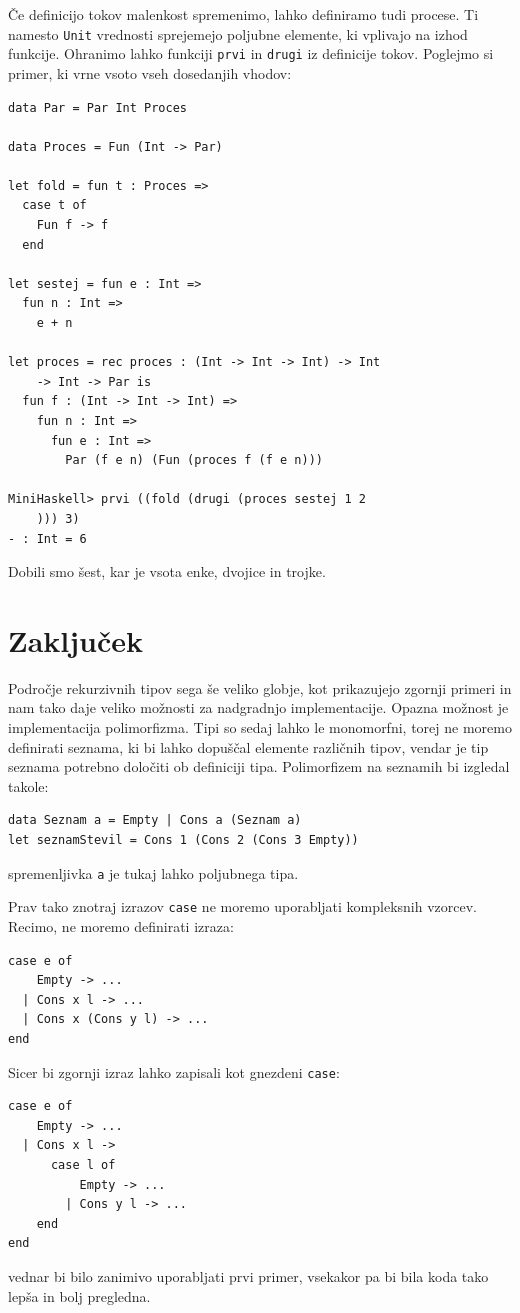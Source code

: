 \documentclass[a4paper,12pt,openright]{book}
\begin{document}
Če definicijo tokov malenkost spremenimo, lahko definiramo tudi procese. Ti namesto \lstinline{Unit} vrednosti sprejemejo poljubne elemente, ki 
vplivajo na izhod funkcije. Ohranimo lahko funkciji \lstinline{prvi} in \lstinline{drugi} iz definicije tokov. Poglejmo si primer, ki vrne vsoto 
vseh dosedanjih vhodov:
\begin{lstlisting}
data Par = Par Int Proces

data Proces = Fun (Int -> Par)

let fold = fun t : Proces =>
  case t of
    Fun f -> f
  end

let sestej = fun e : Int =>
  fun n : Int =>
    e + n

let proces = rec proces : (Int -> Int -> Int) -> Int 
    -> Int -> Par is
  fun f : (Int -> Int -> Int) =>
    fun n : Int =>
      fun e : Int =>
        Par (f e n) (Fun (proces f (f e n)))
  
MiniHaskell> prvi ((fold (drugi (proces sestej 1 2
    ))) 3)
- : Int = 6
\end{lstlisting}
Dobili smo šest, kar je vsota enke, dvojice in trojke.


\chapter{Zaključek}
Področje rekurzivnih tipov sega še veliko globje, kot prikazujejo zgornji primeri in nam tako daje veliko možnosti za nadgradnjo implementacije. 
Opazna možnost je implementacija polimorfizma. Tipi so sedaj lahko le monomorfni, torej ne moremo definirati seznama, ki bi lahko dopuščal elemente različnih tipov, 
vendar je tip seznama potrebno določiti ob definiciji tipa. Polimorfizem na seznamih bi izgledal takole:
\begin{lstlisting}
data Seznam a = Empty | Cons a (Seznam a)
let seznamStevil = Cons 1 (Cons 2 (Cons 3 Empty))
\end{lstlisting}
spremenljivka \lstinline{a} je tukaj lahko poljubnega tipa.

Prav tako znotraj izrazov \lstinline{case} ne moremo uporabljati kompleksnih vzorcev. Recimo, ne moremo definirati izraza:
\begin{lstlisting}
case e of
    Empty -> ...
  | Cons x l -> ...
  | Cons x (Cons y l) -> ...
end
\end{lstlisting}
Sicer bi zgornji izraz lahko zapisali kot gnezdeni \lstinline{case}:
\begin{lstlisting}
case e of
    Empty -> ...
  | Cons x l ->
      case l of
          Empty -> ...
        | Cons y l -> ...
    end
end
\end{lstlisting}
vednar bi bilo zanimivo uporabljati prvi primer, vsekakor pa bi bila koda tako lepša in bolj pregledna.
\end{document}

